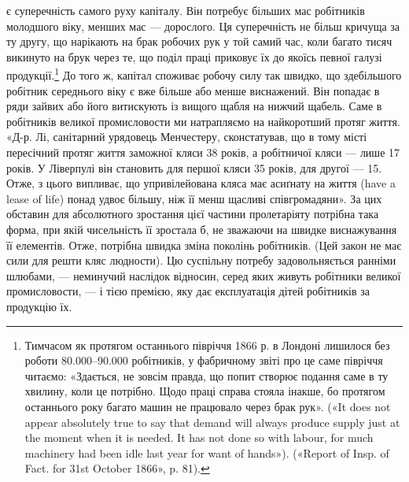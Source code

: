 \parcont{}  %
є суперечність самого руху капіталу. Він потребує більших мас робітників молодшого віку, менших мас
— дорослого. Ця суперечність не більш кричуща за ту другу, що нарікають на брак робочих рук у той
самий час, коли багато тисяч викинуто на
брук через те, що поділ праці приковує їх до якоїсь певної галузі продукції.\footnote{
Тимчасом як протягом останнього півріччя 1866 р. в Лондоні лишилося без роботи \num{80.000}--\num{90.000}
робітників, у фабричному звіті про це саме півріччя читаємо: «Здається, не зовсім правда, що попит
створює подання саме в ту хвилину, коли це потрібно. Щодо праці справа стояла інакше, бо протягом
останнього року багато машин не працювало через брак рук». («It does not appear absolutely true to
say that demand
will always produce supply just at the moment when it is needed. It has not done so with labour, for
much machinery had been idle last year for want of hands»). («Report of Insp. of Fact. for 31st
October 1866», p. 81).
} До того ж, капітал
споживає робочу силу так швидко, що здебільшого робітник середнього віку є вже більше або менше
виснажений. Він попадає в ряди зайвих або його витискують
із вищого щабля на нижчий щабель. Саме в робітників великої промисловости ми натрапляємо на
найкоротший протяг життя. «Д-р. Лі, санітарний урядовець Менчестеру, сконстатував, що в тому місті
пересічний протяг життя заможної кляси
38 років, а робітничої кляси — лише 17 років. У Ліверпулі він становить для першої кляси 35 років,
для другої — 15. Отже, з цього випливає, що упривілейована кляса має асиґнату на життя (have a lease
of life) понад удвоє більшу, ніж її менш щасливі співгромадяни». За цих обставин для абсолютного
зростання цієї частини пролетаріяту потрібна така форма, при якій чисельність її зростала б, не
зважаючи на швидке виснажування її елементів. Отже, потрібна швидка зміна поколінь робітників.
(Цей закон не має сили для решти кляс людности).
Цю суспільну потребу задовольняється ранніми шлюбами, — неминучий наслідок відносин, серед яких
живуть робітники великої промисловости, — і тією премією, яку дає експлуатація дітей робітників за
продукцію їх.

